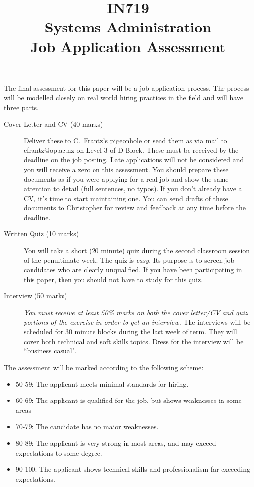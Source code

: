 \documentclass{article}   	%
\title{IN719\\Systems Administration\\Job Application Assessment}
\date{}
\begin{document}
\maketitle
The final assessment for this paper will be a job application process.  The process will be modelled closely on real world hiring practices in the field and will have three parts.


\begin{description}
\item[Cover Letter and CV (40 marks)] Deliver these to C.~Frantz's pigeonhole or send them as via mail to cfrantz@op.ac.nz on Level 3 of D Block.  These must be received by the deadline on the job posting.  Late applications will not be considered and you will receive a zero on this assessment.  You should prepare these documents as if you were applying for a real job and show the same attention to detail (full sentences, no typos).  If you don't already have a CV, it's time to start maintaining one.  You can send drafts of these documents to Christopher for review and feedback at any time before the deadline.

\item[Written Quiz (10 marks)] You will take a short (20 minute) quiz during the second classroom session of the penultimate week.  The quiz is \emph{easy}.  Its purpose is to screen job candidates who are clearly unqualified.  If you have been participating in this paper, then you should not have to study for this quiz.

\item[Interview (50 marks)] \emph{You must receive at least 50\% marks on both the cover letter/CV and quiz portions of the exercise in order to get an interview.} The interviews will be scheduled for 30 minute blocks during the last week of term.  They will cover both technical and soft skills topics.  Dress for the interview will be ``business casual".  

\end{description}

The assessment will be marked according to the following scheme:
\begin{itemize}
\item 50-59:  The applicant meets minimal standards for hiring.  
\item 60-69:  The applicant is qualified for the job, but shows weaknesses in some areas.
\item 70-79:  The candidate has no major weaknesses. 
\item 80-89:  The applicant is very strong in most areas, and may exceed expectations to some degree. 
\item 90-100: The applicant shows technical skills and professionalism far exceeding expectations.  
\end{itemize}
\end{document}

